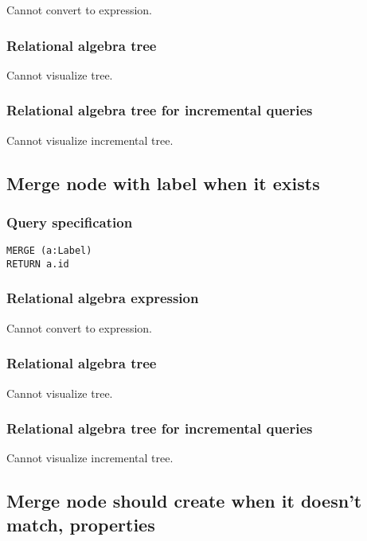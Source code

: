 Cannot convert to expression.

\subsubsection*{Relational algebra tree}

Cannot visualize tree.

\subsubsection*{Relational algebra tree for incremental queries}

Cannot visualize incremental tree.

\subsection{Merge node with label when it exists}

\subsubsection*{Query specification}

\begin{lstlisting}
MERGE (a:Label)
RETURN a.id
\end{lstlisting}

\subsubsection*{Relational algebra expression}

Cannot convert to expression.

\subsubsection*{Relational algebra tree}

Cannot visualize tree.

\subsubsection*{Relational algebra tree for incremental queries}

Cannot visualize incremental tree.

\subsection{Merge node should create when it doesn't match, properties}


